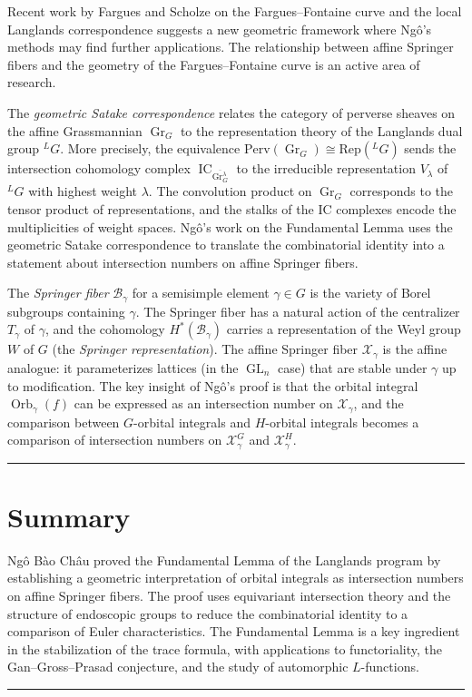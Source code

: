 Recent work by Fargues and Scholze on the Fargues--Fontaine curve and the local Langlands correspondence suggests a new geometric framework where Ngô's methods may find further applications. The relationship between affine Springer fibers and the geometry of the Fargues--Fontaine curve is an active area of research.

The \emph{geometric Satake correspondence} relates the category of perverse sheaves on the affine Grassmannian $\operatorname{Gr}_G$ to the representation theory of the Langlands dual group ${}^L G$. More precisely, the equivalence $\text{Perv}(\operatorname{Gr}_G) \cong \text{Rep}({}^L G)$ sends the intersection cohomology complex $\operatorname{IC}_{\overline{\operatorname{Gr}_G^\lambda}}$ to the irreducible representation $V_\lambda$ of ${}^L G$ with highest weight $\lambda$. The convolution product on $\operatorname{Gr}_G$ corresponds to the tensor product of representations, and the stalks of the IC complexes encode the multiplicities of weight spaces. Ngô's work on the Fundamental Lemma uses the geometric Satake correspondence to translate the combinatorial identity into a statement about intersection numbers on affine Springer fibers.

The \emph{Springer fiber} $\mathcal{B}_\gamma$ for a semisimple element $\gamma \in G$ is the variety of Borel subgroups containing $\gamma$. The Springer fiber has a natural action of the centralizer $T_\gamma$ of $\gamma$, and the cohomology $H^*(\mathcal{B}_\gamma)$ carries a representation of the Weyl group $W$ of $G$ (the \emph{Springer representation}). The affine Springer fiber $\mathcal{X}_\gamma$ is the affine analogue: it parameterizes lattices (in the $\operatorname{GL}_n$ case) that are stable under $\gamma$ up to modification. The key insight of Ngô's proof is that the orbital integral $\operatorname{Orb}_\gamma(f)$ can be expressed as an intersection number on $\mathcal{X}_\gamma$, and the comparison between $G$-orbital integrals and $H$-orbital integrals becomes a comparison of intersection numbers on $\mathcal{X}_\gamma^G$ and $\mathcal{X}_\gamma^H$.

\begin{center}\rule{0.5\linewidth}{0.5pt}\end{center}

\section*{Summary}

Ngô Bào Châu proved the Fundamental Lemma of the Langlands program by establishing a geometric interpretation of orbital integrals as intersection numbers on affine Springer fibers. The proof uses equivariant intersection theory and the structure of endoscopic groups to reduce the combinatorial identity to a comparison of Euler characteristics. The Fundamental Lemma is a key ingredient in the stabilization of the trace formula, with applications to functoriality, the Gan--Gross--Prasad conjecture, and the study of automorphic $L$-functions.

\begin{center}\rule{0.5\linewidth}{0.5pt}\end{center}
